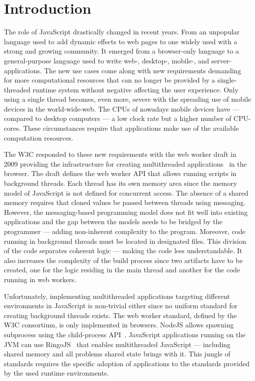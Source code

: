 \section{Introduction}\label{sec:introduction}
The role of JavaScript drastically changed in recent years. From an unpopular language used to add dynamic effects to web pages to one widely used with a strong and growing community. It emerged from a browser-only language to a general-purpose language used to write web-, desktop-, mobile-, and server-applications. The new use cases come along with new requirements demanding for more computational resources that can no longer be provided by a single-threaded runtime system without negative affecting the user experience. Only using a single thread becomes, even more, severe with the spreading use of mobile devices in the world-wide-web. The CPUs of nowadays mobile devices have  --- compared to desktop computers --- a low clock rate but a higher number of CPU-cores. These circumstances require that applications make use of the available computation resources. 

The W3C responded to these new requirements with the web worker draft in 2009 providing the infrastructure for creating multithreaded applications~\cite{w3cWebWorker} in the browser. The draft defines the web worker API that allows running scripts in background threads. Each thread has its own memory area since the  memory model of JavaScript is not defined for concurrent access. The absence of a shared memory requires that cloned values be passed between threads using messaging. However, the messaging-based programming model does not fit well into existing applications and the gap between the models needs to be bridged by the programmer --- adding non-inherent complexity to the program. Moreover, code running in background threads must be located in designated files. This division of the code separates coherent logic --- making the code less understandable. It also increases the complexity of the build process since two artifacts have to be created, one for the logic residing in the main thread and another for the code running in web workers. 

Unfortunately, implementing multithreaded applications targeting different environments in JavaScript is non-trivial either since no uniform standard for creating background threads exists. The web worker standard, defined by the W3C consortium, is only implemented in browsers. NodeJS allows spawning subprocess using the child-process API~\cite{childProcess}. JavaScript applications running on the JVM can use RingoJS~\cite{RingoJS} that enables multithreaded JavaScript --- including shared memory and all problems shared state brings with it. This jungle of standards requires the specific adoption of applications to the standards provided by the used runtime environments.

